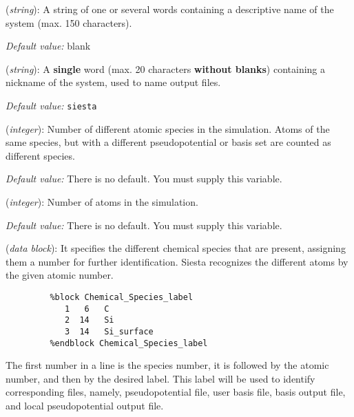 \documentclass[11pt]{article}
\begin{document}
\begin{description}
\itemsep 10pt
\parsep 0pt

\item[{\bf SystemName}] ({\it string}):
A string of one or several words containing a descriptive
name of the system (max. 150 characters).

{\it Default value:} blank

\item[{\bf SystemLabel}] ({\it string}):
A {\bf single} word (max. 20 characters {\bf without blanks})
containing a nickname of the system, used to name output files.

{\it Default value:} {\tt siesta}

\item[{\bf NumberOfSpecies}] ({\it integer}):
Number of different atomic species in the simulation.
Atoms of the same species, but with a different
pseudopotential or basis set are counted as different species.

{\it Default value:} There is no default. You must supply this variable.

\item[{\bf NumberOfAtoms}] ({\it integer}):
Number of atoms in the simulation.

{\it Default value:} There is no default. You must supply this variable.

\item[{\bf ChemicalSpeciesLabel}] ({\it data block}):
It specifies the different chemical species that are present,
assigning them a number for further identification.
{\sc Siesta} recognizes the different atoms by the given atomic number.

\begin{verbatim}
         %block Chemical_Species_label
            1   6   C
            2  14   Si
            3  14   Si_surface
         %endblock Chemical_Species_label
\end{verbatim}

The first number in a line is the species number, it is followed by the
atomic number, and then by the desired label. This label will be used
to identify corresponding files, namely, pseudopotential file, user basis
file, basis output file, and local pseudopotential output file.


\end{description}
\end{document}
